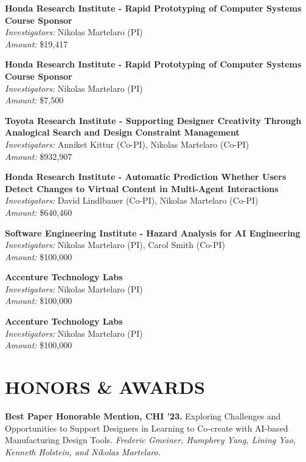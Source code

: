 \documentclass[11pt]{article} %
\begin{document}
 \textbf{Honda Research Institute - Rapid Prototyping of Computer Systems Course Sponsor}\\
\textit{Investigators:} Nikolas Martelaro (PI)\\
\textit{Amount:} \$19,417  
\medskip

 \textbf{Honda Research Institute - Rapid Prototyping of Computer Systems Course Sponsor}\\
\textit{Investigators:} Nikolas Martelaro (PI)\\
\textit{Amount:} \$7,500 
\medskip

 \textbf{Toyota Research Institute - Supporting Designer Creativity Through Analogical Search and Design Constraint Management}\\
\textit{Investigators:} Anniket Kittur (Co-PI), Nikolas Martelaro (Co-PI)\\
\textit{Amount:} \$932,907
\medskip

 \textbf{Honda Research Institute - Automatic Prediction Whether Users Detect Changes to Virtual Content in Multi-Agent Interactions}\\
\textit{Investigators:} David Lindlbauer (Co-PI), Nikolas Martelaro (Co-PI)\\
\textit{Amount:} \$640,460
\medskip

 \textbf{Software Engineering Institute - Hazard Analysis for AI Engineering}\\
\textit{Investigators:} Nikolas Martelaro (PI), Carol Smith (Co-PI)\\
\textit{Amount:} \$100,000
\medskip

 \textbf{Accenture Technology Labs}\\
\textit{Investigators:} Nikolas Martelaro (PI)\\
\textit{Amount:} \$100,000
\medskip

 \textbf{Accenture Technology Labs}\\
\textit{Investigators:} Nikolas Martelaro (PI)\\
\textit{Amount:} \$100,000


\section*{HONORS \& AWARDS}
\textbf{Best Paper Honorable Mention, CHI ’23.} Exploring Challenges and Opportunities to Support Designers in Learning to Co-create with AI-based Manufacturing Design Tools. \textit{Frederic Gmeiner, Humphrey Yang, Lining Yao, Kenneth Holstein, and Nikolas Martelaro.} 
\medskip
\end{document}
